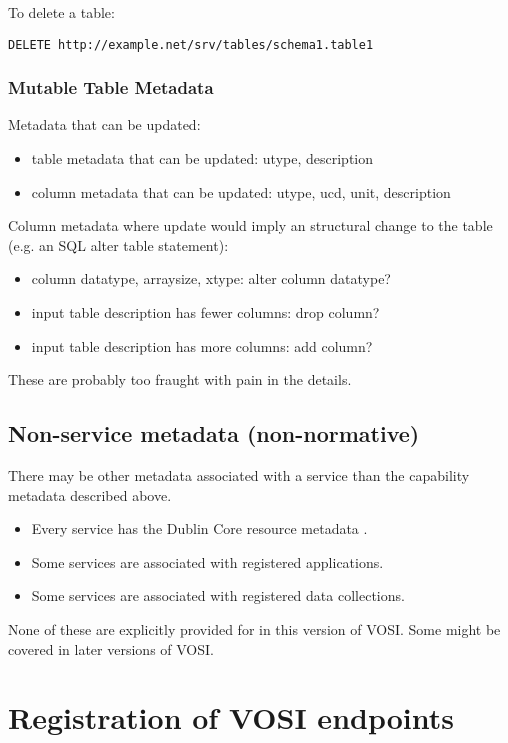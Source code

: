 \documentclass[11pt,letter]{ivoa}
\begin{document}
To delete a table:
\begin{verbatim}
DELETE http://example.net/srv/tables/schema1.table1
\end{verbatim}

\subsubsection{Mutable Table Metadata}
Metadata that can be updated:
\begin{itemize}
\item table metadata that can be updated: utype, description
\item column metadata that can be updated: utype, ucd, unit, description
\end{itemize}

Column metadata where update would imply an structural change to the table (e.g. an SQL
alter table statement):
\begin{itemize}
\item column datatype, arraysize, xtype: alter column datatype?
\item input table description has fewer columns: drop column?
\item input table description has more columns: add column?
\end{itemize}
\noindent These are probably too fraught with pain in the details.

\subsection{Non-service metadata (non-normative)}

There may be other metadata associated with a service than the
capability metadata described above.

\begin{itemize}
\item Every service has the Dublin Core resource metadata \citep{std:DUBLINCORE}.
\item Some services are associated with registered applications.
\item Some services are associated with registered data collections. 
\end{itemize}

None of these are explicitly provided for in this version of VOSI. Some
might be covered in later versions of VOSI. 

\section{Registration of VOSI endpoints}
\label{sec:endpoints}
\end{document}
